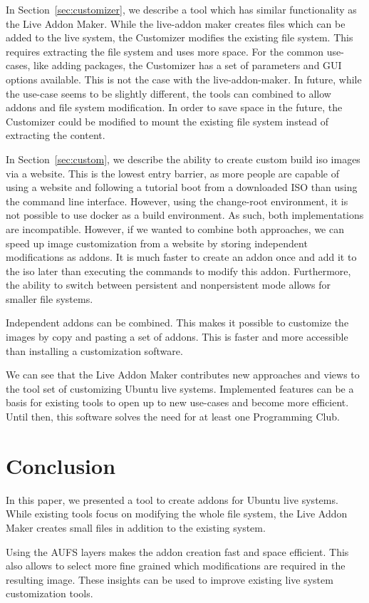 \documentclass[english]{lni}
\begin{document}
In Section~\ref{sec:customizer}, we describe a tool which has similar functionality as the Live Addon Maker.
While the live-addon maker creates files which can be added to the live system,
the Customizer modifies the existing file system.
This requires extracting the file system and uses more space.
For the common use-cases, like adding packages, the Customizer has a set of parameters and GUI options available.
This is not the case with the live-addon-maker.
In future, while the use-case seems to be slightly different, the tools can combined to allow addons and file system modification.
In order to save space in the future, the Customizer could be modified to mount the existing file system instead of extracting the content.

In Section~\ref{sec:custom}, we describe the ability to create custom build iso images via a website.
This is the lowest entry barrier, as more people are capable of using a website and following a tutorial boot from a downloaded ISO than using the command line interface.
However, using the change-root environment, it is not possible to use docker as a build environment.
As such, both implementations are incompatible.
However, if we wanted to combine both approaches, we can speed up image customization from a website by storing independent modifications as addons.
It is much faster to create an addon once and add it to the iso later than executing the commands to modify this addon.
Furthermore, the ability to switch between persistent and nonpersistent mode allows for smaller file systems.

Independent addons can be combined.
This makes it possible to customize the images by copy and pasting a set of addons.
This is faster and more accessible than installing a customization software.

We can see that the Live Addon Maker contributes new approaches and views to the  tool set of customizing Ubuntu live systems.
Implemented features can be a basis for existing tools to open up to new use-cases and become more efficient.
Until then, this software solves the need for at least one Programming Club.

\section{Conclusion}

In this paper, we presented a tool to create addons for Ubuntu live systems.
While existing tools focus on modifying the whole file system, the Live Addon Maker creates small files in addition to the existing system.

Using the AUFS layers makes the addon creation fast and space efficient.
This also allows to select more fine grained which modifications are required in the resulting image.
These insights can be used to improve existing live system customization tools.



\end{document}
